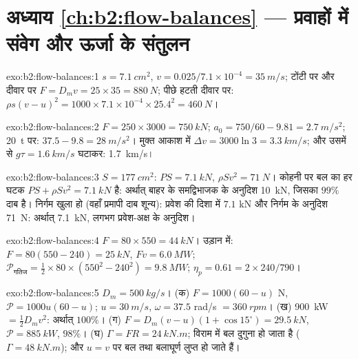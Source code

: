 \section*{अध्याय \ref{ch:b2:flow-balances} --- प्रवाहों में संवेग और ऊर्जा के संतुलन}

\begin{solution}{exo:b2:flow-balances:1}
$s = \qty{7.1}{cm^2}$, $v = 0.025/7.1 \times 10^{-4} = \qty{35}{m/s}$; टोंटी पर और दीवार पर $F = D_mv = 25
\times 35 = \qty{880}{N}$; पीछे हटती दीवार पर: $\rho s(v -
u)^2 = 1000 \times 7.1 \times 10^{-4} \times 25.4^2 = \qty{460}{N}$।
\end{solution}

\begin{solution}{exo:b2:flow-balances:2}
$F = 250 \times 3000 = \qty{750}{kN}$; $a_0 = 750/60 - 9.81 = \qty{2.7}{m/s^2}$;
\qty{20}{t} पर: $37.5 - 9.8 = \qty{28}{m/s^2}$। मुक्त आकाश में $\Delta v = 3000\ln3 = \qty{3.3}{km/s}$;
और उसमें से $g\tau = \qty{1.6}{km/s}$ घटाकर: \qty{1.7}{km/s}।
\end{solution}

\begin{solution}{exo:b2:flow-balances:3}
$S = \qty{177}{cm^2}$: $PS = \qty{7.1}{kN}$, $\rho Sv^2 = \qty{71}{N}$। कोहनी पर बल का
हर घटक $PS + \rho Sv^2 = \qty{7.1}{kN}$ है: अर्थात् बाहर के समद्विभाजक के अनुदिश \qty{10}{kN},
जिसका $99\%$ दाब है। निर्गम खुला हो (वहाँ प्रमापी दाब
शून्य): प्रवेश की दिशा में $7.1$ kN और निर्गम के अनुदिश \qty{71}{N}:
अर्थात् \qty{7.1}{kN}, लगभग प्रवेश-अक्ष के अनुदिश।
\end{solution}

\begin{solution}{exo:b2:flow-balances:4}
$F = 80 \times 550 = \qty{44}{kN}$। उड़ान में: $F = 80(550 - 240) = \qty{25}{kN}$, $Fv =
\qty{6.0}{MW}$; $\mathcal P_{\text{गतिज}} = \tfrac12 \times 80 \times (550^2 - 240^2) =
\qty{9.8}{MW}$; $\eta_p = 0.61 = 2 \times 240/790$।
\end{solution}

\begin{solution}{exo:b2:flow-balances:5}
$D_m = \qty{500}{kg/s}$। (क) $F = 1000(60 - u)$ N, $\mathcal P = 1000u(60 - u)$; $u =
\qty{30}{m/s}$, $\omega = 37.5$ rad/s $= \qty{360}{rpm}$। (ख) \qty{900}{kW} $=
\tfrac12D_mv^2$: अर्थात् $100\%$। (ग) $F = D_m(v - u)(1 + \cos15^\circ) = \qty{29.5}{kN}$, $\mathcal P
= \qty{885}{kW}$, $98\%$। (घ) $\Gamma = FR = \qty{24}{kN.m}$; विराम में बल
दुगुना हो जाता है ($\Gamma = \qty{48}{kN.m}$); और $u = v$ पर बल तथा बलाघूर्ण लुप्त हो जाते हैं।
\end{solution}

